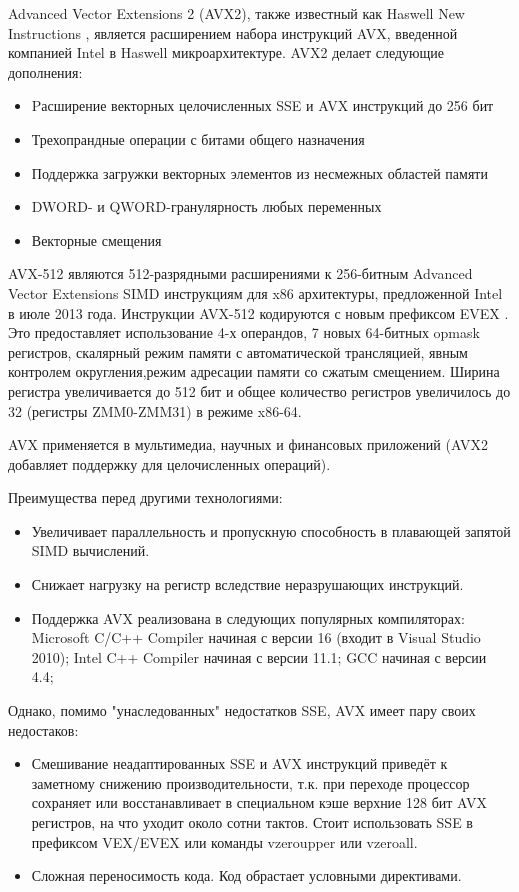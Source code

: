 Advanced Vector Extensions 2 (AVX2), также известный как Haswell New Instructions \cite{bib6},  является расширением набора инструкций AVX, введенной компанией Intel в Haswell микроархитектуре. AVX2 делает следующие дополнения:
\begin{itemize}
\item Pасширение векторных целочисленных SSE и AVX инструкций до 256 бит
\item Трехопрандные операции с битами общего назначения
\item Поддержка загружки векторных элементов из несмежных областей памяти
\item DWORD- и QWORD-гранулярность любых переменных
\item Векторные смещения
\end{itemize}

AVX-512 являются 512-разрядными расширениями к 256-битным Advanced Vector Extensions SIMD инструкциям для x86 архитектуры, предложенной Intel в июле 2013 года. Инструкции AVX-512 кодируются с новым префиксом EVEX . Это предоставляет использование 4-х операндов, 7 новых 64-битных opmask регистров, скалярный режим памяти с автоматической трансляцией, явным контролем округления,режим адресации памяти со сжатым смещением. Ширина регистра увеличивается до 512 бит и общее количество регистров увеличилось до 32 (регистры ZMM0-ZMM31) в режиме x86-64.

AVX применяется в мультимедиа, научных и финансовых приложений (AVX2 добавляет поддержку для целочисленных операций).

Преимущества перед другими технологиями:
\begin{itemize}
\item Увеличивает параллельность и пропускную способность в плавающей запятой SIMD вычислений.
\item Снижает нагрузку на регистр вследствие неразрушающих инструкций.
\item Поддержка AVX реализована в следующих популярных компиляторах:
Microsoft C/C++ Compiler начиная с версии 16 (входит в Visual Studio 2010);
Intel C++ Compiler начиная с версии 11.1;
GCC начиная с версии 4.4;
\end{itemize}

Однако, помимо "унаследованных" недостатков SSE, AVX имеет пару своих недостаков:
\begin{itemize}
	\item Смешивание неадаптированных SSE и AVX инструкций приведёт к заметному снижению производительности, т.к. при переходе процессор сохраняет или восстанавливает в специальном кэше верхние 128 бит AVX регистров, на что уходит около сотни тактов. Стоит использовать SSE в префиксом VEX/EVEX или команды vzeroupper или vzeroall.
	\item Сложная переносимость кода. Код обрастает условными директивами. 
\end{itemize}
